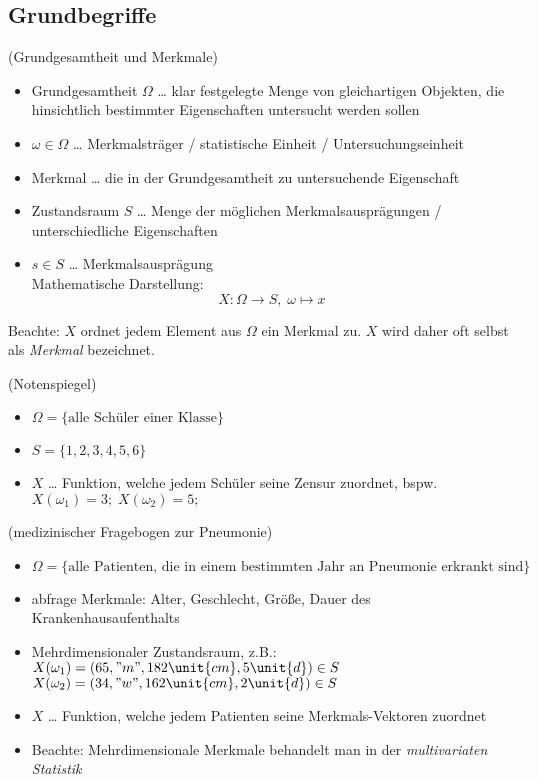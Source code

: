 \documentclass{scrreprt}
\begin{document}
\subsection{Grundbegriffe}
 (Grundgesamtheit und Merkmale)
\begin{itemize}
\item Grundgesamtheit $\Omega$ … klar festgelegte Menge von gleichartigen Objekten, die hinsichtlich bestimmter Eigenschaften untersucht werden sollen
\item $\omega \in \Omega$ … Merkmalsträger / statistische Einheit / Untersuchungseinheit
\item Merkmal … die in der Grundgesamtheit zu untersuchende Eigenschaft
\item Zustandsraum $S$ … Menge der möglichen Merkmalsausprägungen / unterschiedliche Eigenschaften
\item $s \in S$ … Merkmalsausprägung\\
Mathematische Darstellung:
$$X: \Omega \to S, \; \omega \mapsto x$$
\end{itemize}
Beachte: $X$ ordnet jedem Element aus $\Omega$ ein Merkmal zu. $X$ wird daher oft selbst als \emph{Merkmal} bezeichnet.

 (Notenspiegel)
\begin{itemize}
\item $\Omega = \{ \text{alle Schüler einer Klasse}\}$
\item $S=\{1,2,3,4,5,6\}$
\item $X$ … Funktion, welche jedem Schüler seine Zensur zuordnet, bspw. $X(\omega_1) = 3; \; X(\omega_2) = 5;$
\end{itemize}

 (medizinischer Fragebogen zur Pneumonie)
\begin{itemize}
\item $\Omega = \{ \text{alle Patienten, die in einem bestimmten Jahr an Pneumonie erkrankt sind}\}$
\item abfrage Merkmale: Alter, Geschlecht, Größe, Dauer des Krankenhausaufenthalts
\item Mehrdimensionaler Zustandsraum, z.B.:\\
$X(\omega_1)=(65,"m",182\unit{cm},5\unit{d}) \in S$\\
$X(\omega_2)=(34,"w",162\unit{cm},2\unit{d}) \in S$
\item $X$ … Funktion, welche jedem Patienten seine Merkmals-Vektoren zuordnet
\item Beachte: Mehrdimensionale Merkmale behandelt man in der \emph{multivariaten Statistik}
\end{itemize}
\end{document}
